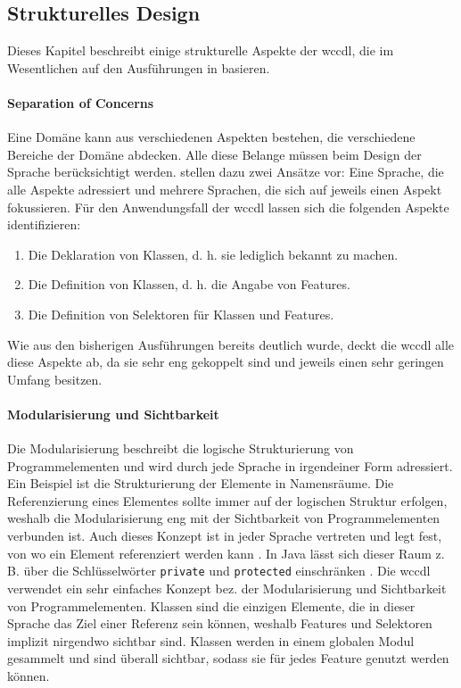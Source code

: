\subsection{Strukturelles Design}
    Dieses Kapitel beschreibt einige strukturelle Aspekte der \gls{wccdl},
    die im Wesentlichen auf den Ausführungen in \cite[Kapitel 4 \& 5.1]{voelter:DslEngineering}
    basieren.

    \paragraph{Separation of Concerns}
    Eine Domäne kann aus verschiedenen Aspekten bestehen,
    die verschiedene Bereiche der Domäne abdecken.
    Alle diese Belange müssen beim Design der Sprache berücksichtigt werden.
    \citet[Kapitel 4.1]{voelter:DslEngineering}
    stellen dazu zwei Ansätze vor: Eine Sprache, die alle Aspekte adressiert
    und mehrere Sprachen, die sich auf jeweils einen Aspekt fokussieren.
    Für den Anwendungsfall der \gls{wccdl} lassen sich die
    folgenden Aspekte identifizieren:

    \begin{enumerate}
        \item Die Deklaration von Klassen, d. h. sie lediglich bekannt zu machen.
        \item Die Definition von Klassen, d. h. die Angabe von Features.
        \item Die Definition von Selektoren für Klassen und Features.
    \end{enumerate}

    Wie aus den bisherigen Ausführungen bereits deutlich wurde,
    deckt die \gls{wccdl} alle diese Aspekte ab,
    da sie sehr eng gekoppelt sind und jeweils einen sehr geringen Umfang besitzen.

    \paragraph{Modularisierung und Sichtbarkeit}
    Die Modularisierung beschreibt die logische Strukturierung
    von Programmelementen und wird durch jede Sprache in irgendeiner Form adressiert.
    Ein Beispiel ist die Strukturierung der Elemente in Namensräume.
    Die Referenzierung eines Elementes sollte immer auf der logischen
    Struktur erfolgen, weshalb die Modularisierung eng mit der Sichtbarkeit
    von Programmelementen verbunden ist.
    Auch dieses Konzept ist in jeder Sprache vertreten und legt fest,
    von wo ein Element referenziert werden kann
    \cite[Kapitel 5.1.1]{voelter:DslEngineering}.
    In Java lässt sich dieser Raum z. B. über die Schlüsselwörter
    \texttt{private} und \texttt{protected} einschränken
    \cite[Kapitel 6.6]{oracle:javaSpec}.
    Die \gls{wccdl} verwendet ein sehr einfaches Konzept bez.
    der Modularisierung und Sichtbarkeit von Programmelementen.
    Klassen sind die einzigen Elemente, die in dieser Sprache das Ziel einer Referenz
    sein können, weshalb Features und Selektoren implizit nirgendwo sichtbar sind.
    Klassen werden in einem globalen Modul gesammelt und sind überall sichtbar,
    sodass sie für jedes Feature genutzt werden können.

